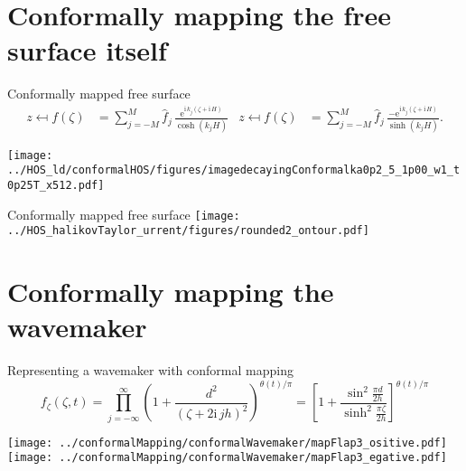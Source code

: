 \documentclass{sintefbeamer}
\newcommand{\mr}{\mathrm}
\newcommand{\ii}{\mr{i}\,}
\newcommand{\ee}{\mr{e}}
\renewcommand{\_}[1]{_\mr{#1}}
\newcommand{\z}{z}
\newcommand{\zz}{\zeta}
\newcommand{\h}{\hat}
\newcommand{\rbr}[1]{\left(#1\right)}
\newcommand{\sbr}[1]{\left[#1\right]}
\begin{document}

\section{Conformally mapping the free surface itself}

\begin{frame}{Conformally mapped free surface}
\centering
\vspace{-1cm}
\small
\begin{align*}
\z \mapsfrom f(\zz) &= \sum_{j=-M}^M \h f_j \,\frac{\ee^{\ii k_j(\zz+\ii H)}}{\cosh(k_j H)}
&
\z \mapsfrom f(\zz) &= \sum_{j=-M}^M \h f_j \,\frac{-\ee^{\ii k_j(\zz+\ii H)}}{\sinh(k_j H)}.
 \end{align*}%
\normalsize

\texttt{[image: ../HOS\_old/conformalHOS/figures/imagedecayingConformalka0p2\_M5\_h1p00\_Nw1\_dt0p25T\_nx512.pdf]}%
\end{frame}

\begin{frame}{Conformally mapped free surface}
	\centering
\texttt{[image: ../HOS\_ChalikovTaylor\_current/figures/rounded2\_contour.pdf]}%
\end{frame}



\section{Conformally mapping the wavemaker}

\begin{frame}{Representing a wavemaker with conformal mapping}
	\centering
\vspace{-1cm}
	\begin{equation*}
f_\zz(\zz,t) = \prod_{j=-\infty}^\infty \rbr{1+\frac{d^2}{\rbr{\zz+2\ii j h}^2}}^{\theta(t)/\pi}
= \sbr{1+\frac{\sin^2\!\frac{\pi d}{2h}}{\sinh^2\!\frac{\pi \zz}{2h}}}^{\theta(t)/\pi}
\end{equation*}

\texttt{[image: ../conformalMapping/conformalWavemaker/mapFlap3\_positive.pdf]}%
\texttt{[image: ../conformalMapping/conformalWavemaker/mapFlap3\_negative.pdf]}%
\end{frame}
\end{document}
